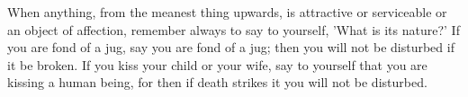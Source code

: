 When anything, from the meanest thing  upwards, is attractive or serviceable or
an  object of  affection, remember  always  to say  to yourself,  'What is  its
nature?' If you are fond of a jug, say you are fond of a jug; then you will not
be disturbed  if it  be broken. If  you kiss  your child or  your wife,  say to
yourself that you are  kissing a human being, for then if  death strikes it you
will not be disturbed.
